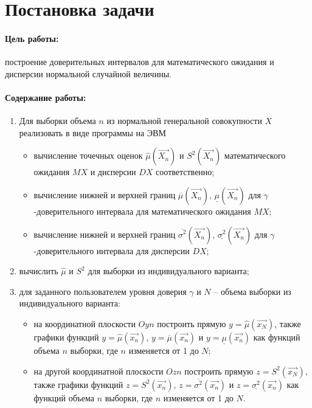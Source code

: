 
\section{Постановка задачи}

\paragraph{Цель работы:} построение доверительных интервалов для математического ожидания и дисперсии нормальной случайной величины.

\paragraph{Содержание работы:}

\begin{enumerate}
    \item Для выборки объема $n$ из нормальной генеральной совокупности $X$ реализовать в виде программы на ЭВМ
    \begin{itemize}
        \item вычисление точечных оценок $\hat{\mu}(\vec{X_n})$ и $S^2(\vec{X_n})$ математического ожидания $MX$ и дисперсии $DX$ соответственно;
        \item вычисление нижней и верхней границ $\overline{\mu}(\vec{X_n})$, $\underline{\mu}(\vec{X_n})$ для $\gamma$-доверительного интервала для математического ожидания $MX$;
        \item вычисление нижней и верхней границ $\overline{\sigma^2}(\vec{X_n})$, $\underline{\sigma^2}(\vec{X_n})$ для $\gamma$-доверительного интервала для дисперсии $DX$;
    \end{itemize}
    \item вычислить $\hat{\mu}$ и $S^2$ для выборки из индивидуального варианта;
    \item для заданного пользователем уровня доверия $\gamma$ и $N$ – объема выборки из индивидуального варианта:
    \begin{itemize}
        \item на координатной плоскости $Oyn$ построить прямую $y = \hat{\mu}(\vec{x_N})$, также графики функций $y = \hat{\mu}(\vec{x_n})$, $y = \overline{\mu}(\vec{x_n})$ и $y = \underline{\mu}(\vec{x_n})$ как функций объема $n$ выборки, где $n$ изменяется от 1 до $N$;
        \item на другой координатной плоскости $Ozn$ построить прямую $z = S^2(\vec{x_N})$, также графики функций $z = S^2(\vec{x_n})$, $z = \overline{\sigma^2}(\vec{x_n})$ и $z = \underline{\sigma^2}(\vec{x_n})$ как функций объема $n$ выборки, где $n$ изменяется от 1 до $N$.
    \end{itemize}
\end{enumerate}